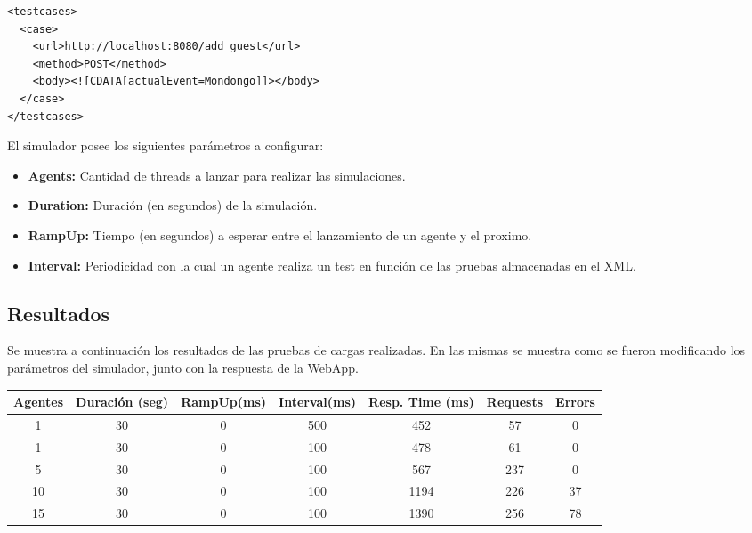 \documentclass[a4paper,10pt]{article}
\begin{document}
        \lstset{language=XML}
        \begin{lstlisting}
<testcases>
  <case>
    <url>http://localhost:8080/add_guest</url>
    <method>POST</method>
    <body><![CDATA[actualEvent=Mondongo]]></body>
  </case>
</testcases>
        \end{lstlisting}

        \vspace{1cm}
        \noindent El simulador posee los siguientes parámetros a configurar:
        \begin{itemize}
            \item \textbf{Agents:} Cantidad de threads a lanzar para realizar las simulaciones.
            \item \textbf{Duration:} Duración (en segundos) de la simulación.
            \item \textbf{RampUp:} Tiempo (en segundos) a esperar entre el lanzamiento de un agente y el proximo.
            \item \textbf{Interval:} Periodicidad con la cual un agente realiza un test en función de las pruebas
            almacenadas en el XML.
        \end{itemize}

        \subsection{Resultados}
            Se muestra a continuación los resultados de las pruebas de cargas realizadas. En las mismas se muestra
            como se fueron modificando los parámetros del simulador, junto con la respuesta de la WebApp. 

            \vspace{1cm}
            \hspace*{-3cm} 
            \begin{tabular}{|c|c|c|c|c|c|c|}
                \hline
                \textbf{Agentes} & \textbf{Duración (seg)} & \textbf{RampUp(ms)} & \textbf{Interval(ms)} & \textbf{Resp. Time (ms)} & \textbf{Requests} & \textbf{Errors} \\
                \hline
                1 & 30 & 0 & 500 & 452 & 57 & 0 \\
                \hline 
                1 & 30 & 0 & 100 & 478 & 61 & 0 \\
                \hline 
                5 & 30 & 0 & 100 & 567 & 237 & 0 \\
                \hline 
                10 & 30 & 0 & 100 & 1194 & 226 & 37 \\
                \hline 
                15 & 30 & 0 & 100 & 1390 & 256 & 78 \\
                \hline 
            \end{tabular}
\end{document}
